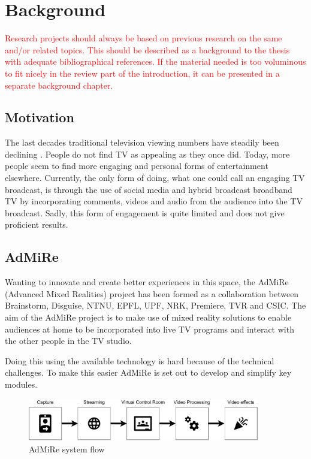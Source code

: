 \chapter{Background}\label{cha:background}
%
\textcolor{red}{Research projects should always be based on previous research on the same and/or related topics. This should be described as a background to the thesis with adequate bibliographical references. If the material needed is too voluminous to fit nicely in the review part of the introduction, it can be presented in a separate background chapter.}


\section{Motivation}\label{sec:motivation}

The last decades traditional television viewing numbers have steadily been declining \cite{ssb_seertall}. People do not find TV as appealing as they once did. Today, more people seem to find more engaging and personal forms of entertainment elsewhere. Currently, the only form of doing, what one could call an engaging TV broadcast, is through the use of social media and hybrid broadcast broadband TV by incorporating comments, videos and audio from the audience into the TV broadcast. Sadly, this form of engagement is quite limited and does not give proficient results. 

\section{AdMiRe}\label{sec:admire}
Wanting to innovate and create better experiences in this space, the AdMiRe \cite{admire} (Advanced Mixed Realities) project has been formed as a collaboration between Brainstorm, Disguise, NTNU, EPFL, UPF, NRK, Premiere, TVR and CSIC. The aim of the AdMiRe project is to make use of mixed reality solutions to enable audiences at home to be incorporated into live TV programs and interact with the other people in the TV studio. 

Doing this using the available technology is hard because of the technical challenges. To make this easier AdMiRe is set out to develop and simplify key modules. 

\begin{figure}[H]
  \centering
  \includegraphics[width=0.9\textwidth]{img/admire_system.pdf}
  \caption{AdMiRe system flow}
  \label{fig:admire_system}
\end{figure}


